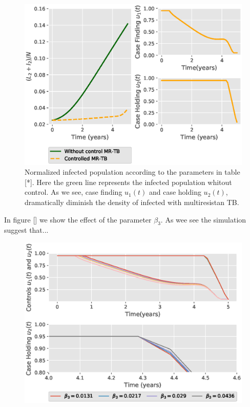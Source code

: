 \begin{figure}
  \centering
  \includegraphics[width=0.7\linewidth]{Figures/figure_1_two_strain_tbm}
  \caption{Normalized infected population according to the parameters in 
  table [*]. Here the green line represents the infected population whitout 
  control. As we see, case finding $u_1(t)$ and case holding $u_2(t)$, 
  dramatically diminish the density of infected with multiresistan TB.}
  \label{fig:figure1twostraintbm}
\end{figure}


In figure [] we show the effect of the parameter $\beta_3$. As wee see the 
simulation suggest that...

\begin{figure}
  \centering
  \includegraphics[width=0.7\linewidth]{Figures/figure_2_two_strain_tbm}
  \caption{}
  \label{fig:figure2twostraintbm}
\end{figure}

